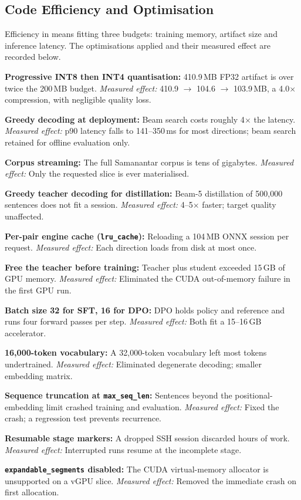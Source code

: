 \subsection{Code Efficiency and Optimisation}
\label{subsec:efficiency}

Efficiency in \setu{} means fitting three budgets: training memory, artifact
size and inference latency. The optimisations applied and their
measured effect are recorded below.

\begin{bullets}
\item \textbf{Progressive INT8 then INT4 quantisation:} 410.9\,MB FP32 artifact is over twice the 200\,MB budget. \emph{Measured effect:} 410.9 $\rightarrow$ 104.6 $\rightarrow$ 103.9\,MB, a 4.0$\times$ compression, with negligible quality loss.
\item \textbf{Greedy decoding at deployment:} Beam search costs roughly 4$\times$ the latency. \emph{Measured effect:} p90 latency falls to 141--350\,ms for most directions; beam search retained for offline evaluation only.
\item \textbf{Corpus streaming:} The full Samanantar corpus is tens of gigabytes. \emph{Measured effect:} Only the requested slice is ever materialised.
\item \textbf{Greedy teacher decoding for distillation:} Beam-5 distillation of 500{,}000 sentences does not fit a session. \emph{Measured effect:} 4--5$\times$ faster; target quality unaffected.
\item \textbf{Per-pair engine cache (\texttt{lru\_cache}):} Reloading a 104\,MB ONNX session per request. \emph{Measured effect:} Each direction loads from disk at most once.
\item \textbf{Free the teacher before training:} Teacher plus student exceeded 15\,GB of GPU memory. \emph{Measured effect:} Eliminated the CUDA out-of-memory failure in the first GPU run.
\item \textbf{Batch size 32 for SFT, 16 for DPO:} DPO holds policy and reference and runs four forward passes per step. \emph{Measured effect:} Both fit a 15--16\,GB accelerator.
\item \textbf{16{,}000-token vocabulary:} A 32{,}000-token vocabulary left most tokens undertrained. \emph{Measured effect:} Eliminated degenerate decoding; smaller embedding matrix.
\item \textbf{Sequence truncation at \texttt{max\_seq\_len}:} Sentences beyond the positional-embedding limit crashed training and evaluation. \emph{Measured effect:} Fixed the crash; a regression test prevents recurrence.
\item \textbf{Resumable stage markers:} A dropped SSH session discarded hours of work. \emph{Measured effect:} Interrupted runs resume at the incomplete stage.
\item \textbf{\texttt{expandable\_segments} disabled:} The CUDA virtual-memory allocator is unsupported on a vGPU slice. \emph{Measured effect:} Removed the immediate crash on first allocation.
\end{bullets}

